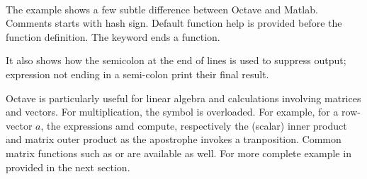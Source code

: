 {\hlstd{}\hlstd{\ \ }\hlstd{}\hspace*{\fill}\\
\hlstd{}\hlstd{\ \ }\hlopt{=\ }\hlopt{{-}\ }\hlopt{{*}}\hlstd{}\hlstd{}\hlopt{;}\hspace*{\fill}\\
\hlstd{\hspace*{\fill}\\
}\hlstd{\ \ }\hlopt{=\ }\hlopt{+\ }\hlopt{/}\hlstd{}\hlstd{}\hlopt{;}\hspace*{\fill}\\
\hlstd{}\hlstd{\ \ }\hlstd{}\hlstd{}\hlopt{(}\hlstd{}\hlstd{}\hlopt{,}\hspace*{\fill}\\
\hlstd{}\hlstd{\ \ \ \ \ \ \ \ \ }\hlopt{,\ }\hlopt{,\ }\hlopt{,\ }\hlopt{,\ }\hlopt{);}\hspace*{\fill}\\
\hlstd{}\hlstd{}\hspace*{\fill}\\
\mbox{}
\normalfont
\normalsize


}

The example shows a few subtle difference between Octave and Matlab. Comments
starts with hash sign. Default function help is provided before the function
definition. The  keyword ends a function.

It also shows how the semicolon at the end of lines is used to suppress
output; expression not ending in a semi-colon print their final result.



Octave is particularly useful for linear algebra and calculations involving
matrices and vectors.  For multiplication, the \code{*} symbol is
overloaded. For example, for a row-vector $a$, the expressions 
amd  compute, respectively the (scalar) inner product and matrix
outer product as the apostrophe invokes a tranposition. Common matrix
functions such as  or  are available as well.  For more
complete example in provided in the next section.


